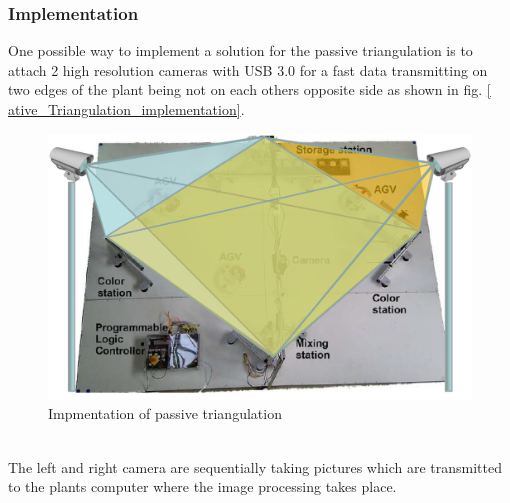 \subsubsection*{Implementation} 
One possible way to implement a solution for the passive triangulation is to attach 2 high resolution cameras with USB 3.0 for a fast data transmitting on two edges of the plant being not on each others opposite side as shown in fig. \ref{ ative_Triangulation_implementation}.
\begin{figure}[!htbp]
\centering
\includegraphics[width = 16cm]{Pictures/triangulationimplementatio}
\caption{Impmentation of passive triangulation}
\label{ative_Triangulation_implementation}
\end{figure}\\
The left and right camera are sequentially taking pictures which are transmitted to the plants computer where the image processing takes place. 

